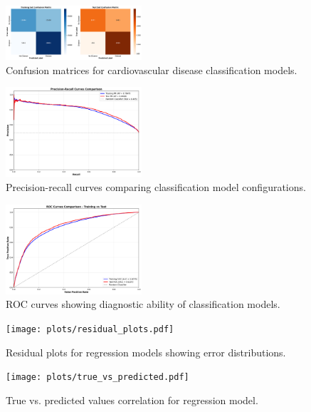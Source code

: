 \documentclass[conference]{IEEEtran}
\begin{document}
\begin{figure}[h]
    \centering
    \includegraphics[width=0.45\textwidth]{plots/confusion_matrices.pdf}
    \caption{Confusion matrices for cardiovascular disease classification models.}
    \label{fig:confusion_matrices}
\end{figure}

\begin{figure}[h]
    \centering
    \includegraphics[width=0.45\textwidth]{plots/precision_recall_comparison.pdf}
    \caption{Precision-recall curves comparing classification model configurations.}
    \label{fig:precision_recall}
\end{figure}

\begin{figure}[h]
    \centering
    \includegraphics[width=0.45\textwidth]{plots/roc_comparison.pdf}
    \caption{ROC curves showing diagnostic ability of classification models.}
    \label{fig:roc_comparison}
\end{figure}

\begin{figure}[h]
    \centering
    \texttt{[image: plots/residual\_plots.pdf]}
    \caption{Residual plots for regression models showing error distributions.}
    \label{fig:residual_plots}
\end{figure}

\begin{figure}[h]
    \centering
    \texttt{[image: plots/true\_vs\_predicted.pdf]}
    \caption{True vs. predicted values correlation for regression model.}
    \label{fig:true_vs_predicted}
\end{figure}
\end{document}

